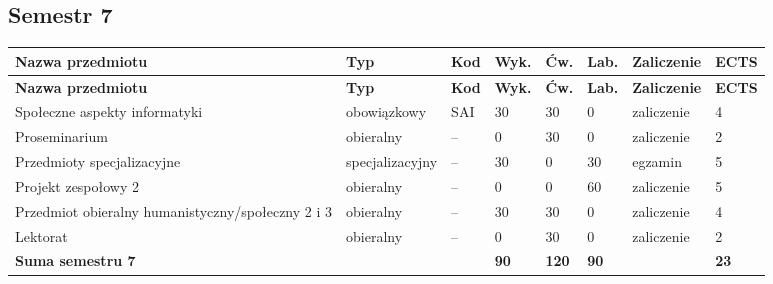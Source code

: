 \documentclass[12pt,a4paper]{article}
\newcommand{\thdrule}{\noalign{\global\setlength{\extrarowheight}{0pt}}}
\newcommand{\thdend}{\noalign{\global\setlength{\extrarowheight}{4pt}}}
\begin{document}
\clearpage
\subsection*{Semestr 7}

{\scriptsize
\begin{longtable}{m{5.0cm}m{1.9cm}m{0.75cm}m{0.85cm}m{0.85cm}m{0.85cm}m{1.45cm}m{0.9cm}}
\thdrule\toprule
\rowcolor{pjatkRed}
{\color{white}\footnotesize\textbf{\vphantom{Ag}Nazwa przedmiotu}} & {\color{white}\footnotesize\textbf{\vphantom{Ag}Typ}} & {\color{white}\footnotesize\textbf{\vphantom{Ag}Kod}} & {\color{white}\footnotesize\textbf{\vphantom{Ag}Wyk.}} & {\color{white}\footnotesize\textbf{\vphantom{Ag}Ćw.}} & {\color{white}\footnotesize\textbf{\vphantom{Ag}Lab.}} & {\color{white}\footnotesize\textbf{\vphantom{Ag}Zaliczenie}} & {\color{white}\footnotesize\textbf{\vphantom{Ag}ECTS}} \\
\midrule\thdend
\endfirsthead
\thdrule\toprule
\rowcolor{pjatkRed}
{\color{white}\footnotesize\textbf{\vphantom{Ag}Nazwa przedmiotu}} & {\color{white}\footnotesize\textbf{\vphantom{Ag}Typ}} & {\color{white}\footnotesize\textbf{\vphantom{Ag}Kod}} & {\color{white}\footnotesize\textbf{\vphantom{Ag}Wyk.}} & {\color{white}\footnotesize\textbf{\vphantom{Ag}Ćw.}} & {\color{white}\footnotesize\textbf{\vphantom{Ag}Lab.}} & {\color{white}\footnotesize\textbf{\vphantom{Ag}Zaliczenie}} & {\color{white}\footnotesize\textbf{\vphantom{Ag}ECTS}} \\
\midrule\thdend
\endhead
\rowcolor{tableRowLight} Społeczne aspekty informatyki & {\scriptsize obowiązkowy} & SAI & 30 & 30 & 0 & {\scriptsize zaliczenie} & 4 \\
\rowcolor{tableElective} Proseminarium & {\scriptsize obieralny} & -- & 0 & 30 & 0 & {\scriptsize zaliczenie} & 2 \\
\rowcolor{tableElective} Przedmioty specjalizacyjne & {\scriptsize specjalizacyjny} & -- & 30 & 0 & 30 & {\scriptsize egzamin} & 5 \\
\rowcolor{tableElective} Projekt zespołowy 2 & {\scriptsize obieralny} & -- & 0 & 0 & 60 & {\scriptsize zaliczenie} & 5 \\
\rowcolor{tableElective} Przedmiot obieralny humanistyczny/społeczny 2 i 3 & {\scriptsize obieralny} & -- & 30 & 30 & 0 & {\scriptsize zaliczenie} & 4 \\
\rowcolor{tableElective} Lektorat & {\scriptsize obieralny} & -- & 0 & 30 & 0 & {\scriptsize zaliczenie} & 2 \\
\midrule[\heavyrulewidth]
\rowcolor{tableSummary} \textbf{Suma semestru 7} & & & \textbf{90} & \textbf{120} & \textbf{90} & & \textbf{23} \\
\bottomrule
\end{longtable}}
\end{document}
